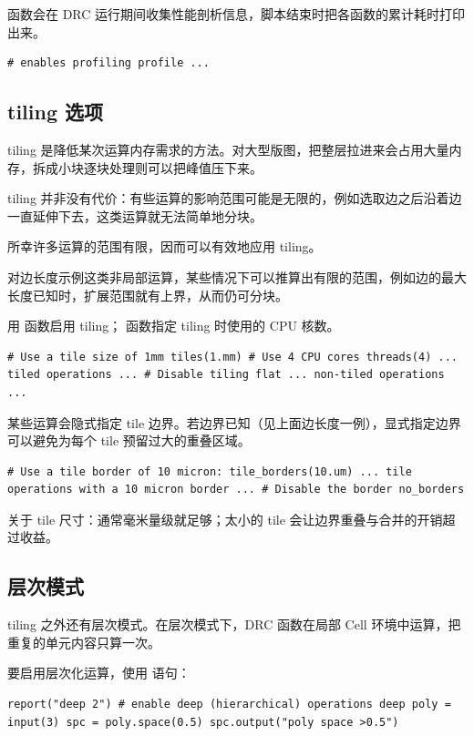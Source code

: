  函数会在 DRC 运行期间收集性能剖析信息，脚本结束时把各函数的累计耗时打印出来。

\begin{lstlisting}
# enables profiling profile ...
\end{lstlisting}

\subsection{tiling 选项}

tiling 是降低某次运算内存需求的方法。对大型版图，把整层拉进来会占用大量内存，拆成小块逐块处理则可以把峰值压下来。

tiling 并非没有代价：有些运算的影响范围可能是无限的，例如选取边之后沿着边一直延伸下去，这类运算就无法简单地分块。

所幸许多运算的范围有限，因而可以有效地应用 tiling。

对边长度示例这类非局部运算，某些情况下可以推算出有限的范围，例如边的最大长度已知时，扩展范围就有上界，从而仍可分块。

用  函数启用 tiling； 函数指定 tiling 时使用的 CPU 核数。

\begin{lstlisting}
# Use a tile size of 1mm tiles(1.mm) # Use 4 CPU cores threads(4) ... tiled operations ... # Disable tiling flat ... non-tiled operations ...
\end{lstlisting}

某些运算会隐式指定 tile 边界。若边界已知（见上面边长度一例），显式指定边界可以避免为每个 tile 预留过大的重叠区域。

\begin{lstlisting}
# Use a tile border of 10 micron: tile_borders(10.um) ... tile operations with a 10 micron border ... # Disable the border no_borders
\end{lstlisting}

关于 tile 尺寸：通常毫米量级就足够；太小的 tile 会让边界重叠与合并的开销超过收益。

\subsection{层次模式}

tiling 之外还有层次模式。在层次模式下，DRC 函数在局部 Cell 环境中运算，把重复的单元内容只算一次。

要启用层次化运算，使用  语句：

\begin{lstlisting}
report("deep 2") # enable deep (hierarchical) operations deep poly = input(3) spc = poly.space(0.5) spc.output("poly space >0.5")
\end{lstlisting}

